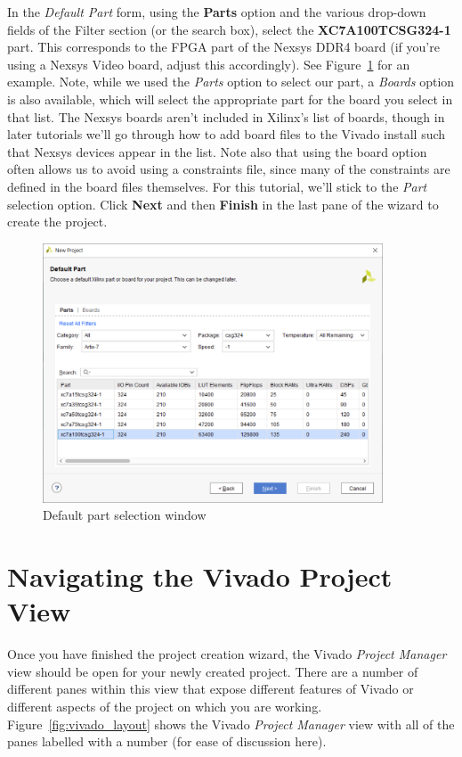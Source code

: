 \documentclass[11pt]{article}
\begin{document}
In the \textit{Default Part} form, using the \textbf{Parts} option and the various drop-down fields of the Filter section (or the search box), select the \textbf{XC7A100TCSG324-1} part. This corresponds to the FPGA part of the Nexsys DDR4 board (if you're using a Nexsys Video board, adjust this accordingly). See Figure~\ref{fig:new_proj_device} for an example. Note, while we used the \textit{Parts} option to select our part, a \textit{Boards} option is also available, which will select the appropriate part for the board you select in that list. The Nexsys boards aren't included in Xilinx's list of boards, though in later tutorials we'll go through how to add board files to the Vivado install such that Nexsys devices appear in the list. Note also that using the board option often allows us to avoid using a constraints file, since many of the constraints are defined in the board files themselves. For this tutorial, we'll stick to the \textit{Part} selection option. Click \textbf{Next} and then \textbf{Finish} in the last pane of the wizard to create the project.

\begin{figure}[!h]
    \centering
    \includegraphics[width=0.9\textwidth]{images/new_proj_device.png}
    \caption{Default part selection window}
    \label{fig:new_proj_device}
\end{figure}




\section{Navigating the Vivado Project View}
\label{sec:navigating_vivado}
Once you have finished the project creation wizard, the Vivado \textit{Project Manager} view should be open for your newly created project. There are a number of different panes within this view that expose different features of Vivado or different aspects of the project on which you are working. Figure~\ref{fig:vivado_layout} shows the Vivado \textit{Project Manager} view with all of the panes labelled with a number (for ease of discussion here).
\end{document}
